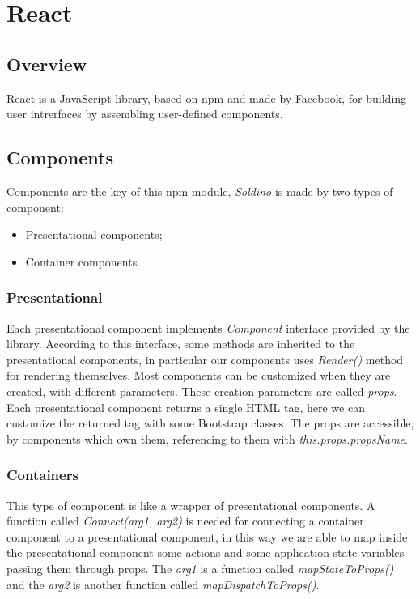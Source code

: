 \section{React} 

\subsection{Overview}
React is a JavaScript library, based on npm and made by Facebook, for building user intrerfaces by assembling user-defined components.
\subsection{Components}
Components are the key of this npm module, \textit{Soldino} is made by two types of component:
\begin{itemize}
	\item Presentational components;
	\item Container components.
\end{itemize}
\subsubsection{Presentational}
Each presentational component implements \textit{Component} interface provided by the library. According to this interface, some methods are inherited to the presentational components, in particular our components uses \textit{Render()} method for rendering themselves.
Most components can be customized when they are created, with different parameters. These creation parameters are called \textit{props}. Each presentational component returns a single HTML tag, here we can customize the returned tag with some Bootstrap classes. The props are accessible, by components which own them, referencing to them with \textit{this.props.propsName}.
\subsubsection{Containers} 
This type of component is like a wrapper of presentational components. A function called \textit{Connect(arg1, arg2)} is needed for connecting a container component to a presentational component, in this way we are able to map inside the presentational component some actions and some application state variables passing them through props. The \textit{arg1} is a function called \textit{mapStateToProps()} and the \textit{arg2} is another function called \textit{mapDispatchToProps()}.
